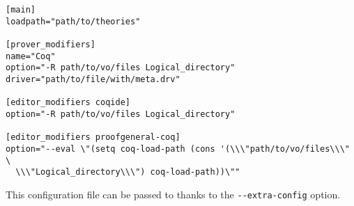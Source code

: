 \begin{verbatim}
[main]
loadpath="path/to/theories"

[prover_modifiers]
name="Coq"
option="-R path/to/vo/files Logical_directory"
driver="path/to/file/with/meta.drv"

[editor_modifiers coqide]
option="-R path/to/vo/files Logical_directory"

[editor_modifiers proofgeneral-coq]
option="--eval \"(setq coq-load-path (cons '(\\\"path/to/vo/files\\\" \
  \\\"Logical_directory\\\") coq-load-path))\""
\end{verbatim}

This configuration file can be passed to \why thanks to the
\verb+--extra-config+ option.












